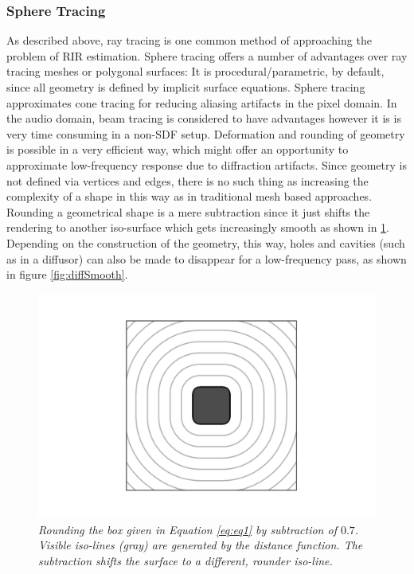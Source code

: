\documentclass[twoside,a4paper]{article}
\begin{document}
\subsubsection{Sphere Tracing}
As described above, ray tracing is one common method of approaching the problem of RIR estimation. Sphere tracing offers a number of advantages over ray tracing meshes or polygonal surfaces: It is procedural/parametric, by default, since all geometry is defined by implicit surface equations. Sphere tracing approximates cone tracing for reducing aliasing artifacts in the pixel domain\cite{hart_sphere_1996}. In the audio domain, beam tracing is considered to have advantages however it is is very time consuming in a non-SDF setup\cite{alpkocak_computing_2010}. Deformation and rounding of geometry is possible in a very efficient way, which might offer an opportunity to approximate low-frequency response due to diffraction artifacts. Since geometry is not defined via vertices and edges, there is no such thing as increasing the complexity of a shape in this way as in traditional mesh based approaches. Rounding a geometrical shape is a mere subtraction since it just shifts the rendering to another iso-surface which gets increasingly smooth as shown in \ref{sdf_2d_box}. Depending on the construction of the geometry, this way, holes and cavities (such as in a diffusor) can also be made to disappear for a low-frequency pass, as shown in figure \ref{fig:diffSmooth}.

\begin{figure}[ht]
\centerline{\includegraphics[scale=0.6]{img/sdf2dbox.png}}
\caption{\label{sdf_2d_box}{\it Rounding the box given in Equation \ref{eq:eq1} by subtraction of $0.7$. Visible iso-lines (gray) are generated by the distance function. The subtraction shifts the surface to a different, rounder iso-line.}}
\end{figure}  
\end{document}
